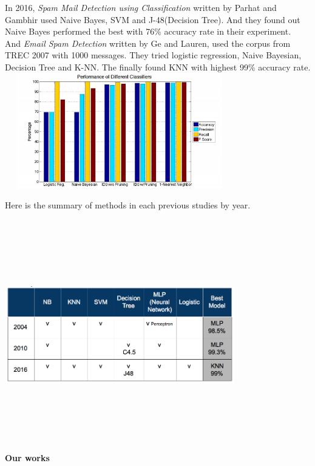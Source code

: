 In 2016, \textit{Spam Mail Detection using Classification} written by Parhat and Gambhir used Naive Bayes, SVM and J-48(Decision Tree). And they found out Naive Bayes performed the best with 76\% accuracy rate in their experiment. \\ And \textit{Email Spam Detection} written by Ge and  Lauren, used the corpus from TREC 2007 with 1000 messages. They tried logistic regression, Naive Bayesian, Decision Tree and K-NN. The finally found KNN with highest 99\% accuracy rate. \\
\includegraphics[width=10cm,height=5cm,keepaspectratio]{2016.png}

Here is the summary of methods in each previous studies by year. 

\includegraphics[width=10cm,height=10cm,keepaspectratio]{Method_Summary.png}\\


\textbf{Our works}\\

